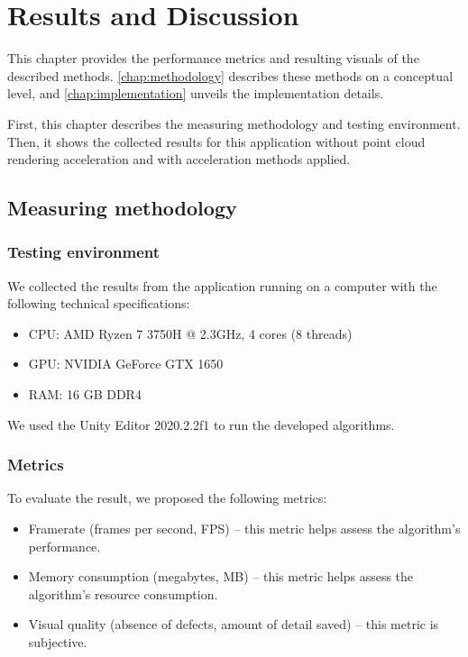 \chapter{Results and Discussion}
\label{chap:results}

\graphicspath{{figs/results/}}

This chapter provides the performance metrics and resulting visuals of the described methods. \autoref{chap:methodology} describes these methods on a conceptual level, and \autoref{chap:implementation} unveils the implementation details.

First, this chapter describes the measuring methodology and testing environment. Then, it shows the collected results for this application without point cloud rendering acceleration and with acceleration methods applied.


\section{Measuring methodology}

\subsection{Testing environment}

We collected the results from the application running on a computer with the following technical specifications:

\begin{itemize}
    \item CPU: AMD Ryzen 7 3750H @ 2.3GHz, 4 cores (8 threads)
    \item GPU: NVIDIA GeForce GTX 1650
    \item RAM: 16 GB DDR4
\end{itemize}

We used the Unity Editor 2020.2.2f1 to run the developed algorithms.

\subsection{Metrics}

To evaluate the result, we proposed the following metrics:

\begin{itemize}
    \item Framerate (frames per second, FPS) – this metric helps assess the algorithm's performance.
    \item Memory consumption (megabytes, MB) – this metric helps assess the algorithm's resource consumption.
    \item Visual quality (absence of defects, amount of detail saved) – this metric is subjective.
\end{itemize}

